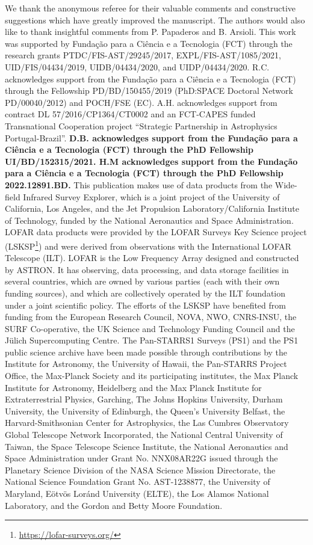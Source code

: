 \documentclass{aa}
\begin{document}
\begin{acknowledgements}
We thank the anonymous referee for their valuable comments
and constructive suggestions which have greatly improved the
manuscript. The authors would also like to thank insightful comments from P. Papaderos and B. Arsioli.
This work was supported by Fundação para a Ciência e a Tecnologia (FCT) through the research grants PTDC/FIS-AST/29245/2017, EXPL/FIS-AST/1085/2021, UID/FIS/04434/2019, UIDB/04434/2020, and UIDP/04434/2020. R.C. acknowledges support from the Fundação para a Ciência e a Tecnologia (FCT) through the Fellowship PD/BD/150455/2019 (PhD:SPACE Doctoral Network PD/00040/2012) and POCH/FSE (EC). A.H. acknowledges support from contract DL 57/2016/CP1364/CT0002 and an FCT-CAPES funded Transnational Cooperation project ``Strategic Partnership in Astrophysics Portugal-Brazil''. \textbf{D.B. acknowledges support from the Fundação para a Ciência e a Tecnologia (FCT) through the PhD Fellowship UI/BD/152315/2021. H.M acknowledges support from the Fundação para a Ciência e a Tecnologia (FCT) through the PhD Fellowship 2022.12891.BD.}
This publication makes use of data products from the Wide-field Infrared Survey Explorer, which is a joint project of the University of California, Los Angeles, and the Jet Propulsion Laboratory/California Institute of Technology, funded by the National Aeronautics and Space Administration.
LOFAR data products were provided by the LOFAR Surveys Key Science project (LSKSP\footnote{\url{https://lofar-surveys.org/}}) and were derived from observations with the International LOFAR Telescope (ILT). LOFAR \citep{2013A&A...556A...2V} is the Low Frequency Array designed and constructed by ASTRON. It has observing, data processing, and data storage facilities in several countries, which are owned by various parties (each with their own funding sources), and which are collectively operated by the ILT foundation under a joint scientific policy. The efforts of the LSKSP have benefited from funding from the European Research Council, NOVA, NWO, CNRS-INSU, the SURF Co-operative, the UK Science and Technology Funding Council and the Jülich Supercomputing Centre.
The Pan-STARRS1 Surveys (PS1) and the PS1 public science archive have been made possible through contributions by the Institute for Astronomy, the University of Hawaii, the Pan-STARRS Project Office, the Max-Planck Society and its participating institutes, the Max Planck Institute for Astronomy, Heidelberg and the Max Planck Institute for Extraterrestrial Physics, Garching, The Johns Hopkins University, Durham University, the University of Edinburgh, the Queen's University Belfast, the Harvard-Smithsonian Center for Astrophysics, the Las Cumbres Observatory Global Telescope Network Incorporated, the National Central University of Taiwan, the Space Telescope Science Institute, the National Aeronautics and Space Administration under Grant No. NNX08AR22G issued through the Planetary Science Division of the NASA Science Mission Directorate, the National Science Foundation Grant No. AST-1238877, the University of Maryland, E\"{o}tv\"{o}s Lor\'{a}nd University (ELTE), the Los Alamos National Laboratory, and the Gordon and Betty Moore Foundation.

\end{acknowledgements}
\end{document}
